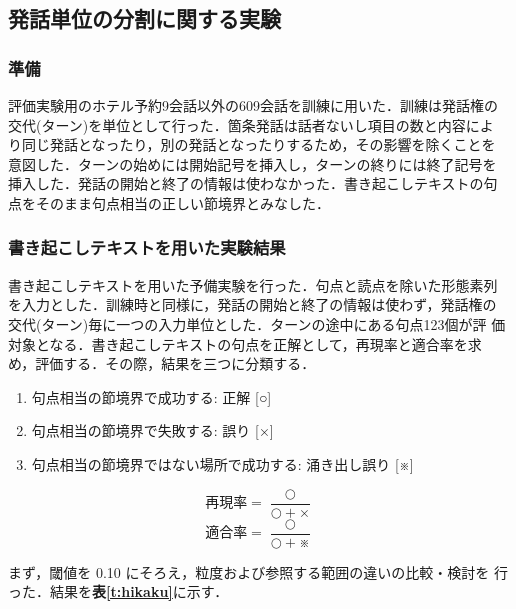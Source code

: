 \subsection{発話単位の分割に関する実験}

\subsubsection{準備}

評価実験用のホテル予約9会話以外の609会話を訓練に用いた．訓練は発話権の
交代(ターン)を単位として行った．箇条発話は話者ないし項目の数と内容によ
り同じ発話となったり，別の発話となったりするため，その影響を除くことを
意図した．ターンの始めには開始記号を挿入し，ターンの終りには終了記号を
挿入した．発話の開始と終了の情報は使わなかった．書き起こしテキストの句
点をそのまま句点相当の正しい節境界とみなした．

\subsubsection{書き起こしテキストを用いた実験結果}

書き起こしテキストを用いた予備実験を行った．句点と読点を除いた形態素列
を入力とした．訓練時と同様に，発話の開始と終了の情報は使わず，発話権の
交代(ターン)毎に一つの入力単位とした．ターンの途中にある句点123個が評
価対象となる．書き起こしテキストの句点を正解として，再現率と適合率を求
め，評価する．その際，結果を三つに分類する．

\begin{enumerate}
\item 句点相当の節境界で成功する: 正解 [○]
\item 句点相当の節境界で失敗する: 誤り [×]
\item 句点相当の節境界ではない場所で成功する: 涌き出し誤り [※]
\end{enumerate}

\begin{equation}
再現率=\frac{○}{○+×}
\end{equation}
\begin{equation}
適合率=\frac{○}{○+※}
\end{equation}

まず，閾値を 0.10 にそろえ，粒度および参照する範囲の違いの比較・検討を
行った．結果を{\bf\dg 表\ref{t:hikaku}}に示す．

